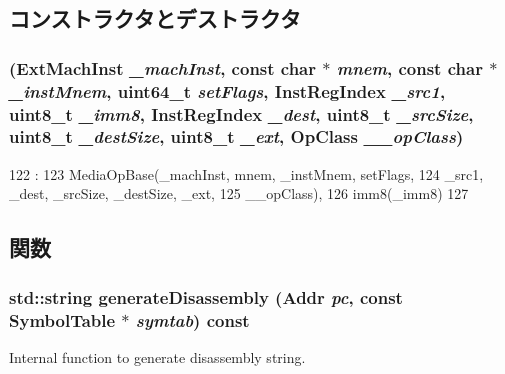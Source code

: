 \subsection{コンストラクタとデストラクタ}
\hypertarget{classX86ISA_1_1MediaOpImm_a5e4cb19b40beae17fdf7aabcfe3456c4}{
\subsubsection[{MediaOpImm}]{ ({\bf ExtMachInst} {\em \_\-machInst}, \/  const char $\ast$ {\em mnem}, \/  const char $\ast$ {\em \_\-instMnem}, \/  uint64\_\-t {\em setFlags}, \/  {\bf InstRegIndex} {\em \_\-src1}, \/  uint8\_\-t {\em \_\-imm8}, \/  {\bf InstRegIndex} {\em \_\-dest}, \/  uint8\_\-t {\em \_\-srcSize}, \/  uint8\_\-t {\em \_\-destSize}, \/  uint8\_\-t {\em \_\-ext}, \/  OpClass {\em \_\-\_\-opClass})}}
\label{classX86ISA_1_1MediaOpImm_a5e4cb19b40beae17fdf7aabcfe3456c4}



\begin{DoxyCode}
122                                    :
123             MediaOpBase(_machInst, mnem, _instMnem, setFlags,
124                     _src1, _dest, _srcSize, _destSize, _ext,
125                     __opClass),
126             imm8(_imm8)
127         {}

\end{DoxyCode}


\subsection{関数}
\hypertarget{classX86ISA_1_1MediaOpImm_a95d323a22a5f07e14d6b4c9385a91896}{
\subsubsection[{generateDisassembly}]{\setlength{\rightskip}{0pt plus 5cm}std::string generateDisassembly ({\bf Addr} {\em pc}, \/  const {\bf SymbolTable} $\ast$ {\em symtab}) const}}
\label{classX86ISA_1_1MediaOpImm_a95d323a22a5f07e14d6b4c9385a91896}
Internal function to generate disassembly string. 

